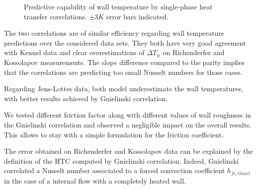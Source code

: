 \begin{figure}[h!]
\centering
{} 
\caption{Predictive capability of wall temperature by single-phase heat transfer correlations. $\pm 3K$ error bars indicated.}
\label{fig:dittus_gniel_htc}
\end{figure}

The two correlations are of similar efficiency regarding wall temperature predictions over the considered data sets. They both have very good agreement with Kennel data and clear overestimations of $\Delta T_{w}$ on Richenderfer and Kossolapov measurements. The slope difference compared to the parity implies that the correlations are predicting too small Nusselt numbers for those cases. 

Regarding Jens-Lottes data, both model underestimate the wall temperatures, with better results achieved by Gnielinski correlation.

\begin{remark*}{}
We tested different friction factor along with different values of wall roughness in the Gnielinski correlation and observed a negligible impact on the overall results. This allows to stay with a simple formulation for the friction coefficient.
\end{remark*}


The error obtained on Richenderfer and Kossolapov data can be explained by the definition of the HTC computed by Gnielinski correlation. Indeed, Gnielinski correlated a Nusselt number associated to a forced convection coefficient $h_{fc,Gniel}$ in the case of a internal flow with a completely heated wall.

